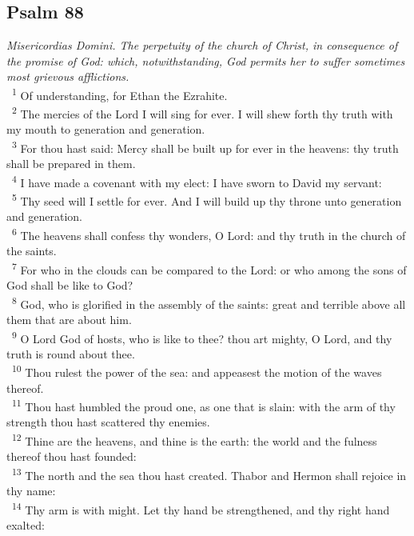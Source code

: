\documentclass[a5paper,12pt]{article}
\begin{document}
\begin{multicols*}{2}
\section{Psalm 88}
\label{sec:orgc850f6d}
\emph{Misericordias Domini. The perpetuity of the church of Christ, in consequence of the promise of God: which, notwithstanding, God permits her to suffer sometimes most grievous afflictions.}\\

~\textsuperscript{1} Of understanding, for Ethan the Ezrahite.\\
~\textsuperscript{2} The mercies of the Lord I will sing for ever. I will shew forth thy truth with my mouth to generation and generation.\\
~\textsuperscript{3} For thou hast said: Mercy shall be built up for ever in the heavens: thy truth shall be prepared in them.\\
~\textsuperscript{4} I have made a covenant with my elect: I have sworn to David my servant:\\
~\textsuperscript{5} Thy seed will I settle for ever. And I will build up thy throne unto generation and generation.\\
~\textsuperscript{6} The heavens shall confess thy wonders, O Lord: and thy truth in the church of the saints.\\
~\textsuperscript{7} For who in the clouds can be compared to the Lord: or who among the sons of God shall be like to God?\\
~\textsuperscript{8} God, who is glorified in the assembly of the saints: great and terrible above all them that are about him.\\
~\textsuperscript{9} O Lord God of hosts, who is like to thee? thou art mighty, O Lord, and thy truth is round about thee.\\
~\textsuperscript{10} Thou rulest the power of the sea: and appeasest the motion of the waves thereof.\\
~\textsuperscript{11} Thou hast humbled the proud one, as one that is slain: with the arm of thy strength thou hast scattered thy enemies.\\
~\textsuperscript{12} Thine are the heavens, and thine is the earth: the world and the fulness thereof thou hast founded:\\
~\textsuperscript{13} The north and the sea thou hast created. Thabor and Hermon shall rejoice in thy name:\\
~\textsuperscript{14} Thy arm is with might. Let thy hand be strengthened, and thy right hand exalted:\\

\end{multicols*}
\end{document}
